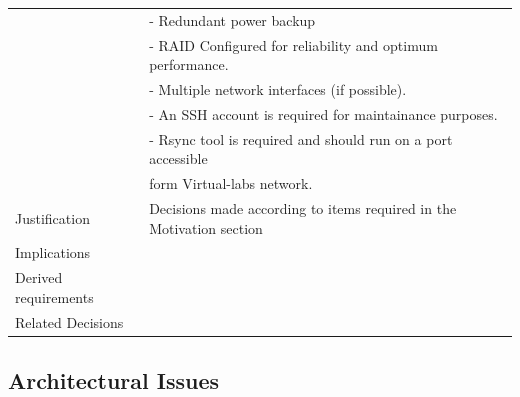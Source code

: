 \documentclass[11pt]{article}
\begin{document}
\begin{table}[H]
\begin{center}
\begin{tabular}{ll}
                         &  - Redundant power backup                                                  \\
                         &  - RAID Configured for reliability and optimum performance.                \\
                         &  - Multiple network interfaces (if possible).                              \\
                         &  - An SSH account is required for maintainance purposes.                   \\
                         &  - Rsync tool is required and should run on a port accessible              \\
                         &  form Virtual-labs network.                                                \\
 Justification           &  Decisions made according to items required in the Motivation section      \\
 Implications            &                                                                            \\
 Derived requirements    &                                                                            \\
 Related Decisions       &                                                                            \\
\hline
\end{tabular}
\end{center}
\end{table}


\subsection{Architectural Issues}
\label{sec-7.4}
\end{document}
